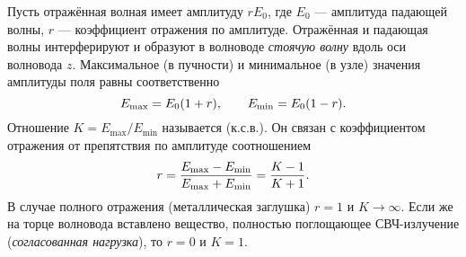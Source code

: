 Пусть отражённая волная имеет амплитуду $r E_0$, где $E_0$ --- амплитуда
падающей волны, $r$ --- коэффициент отражения по амплитуде.
Отражённая и падающая волны интерферируют и образуют в волноводе 
\emph{стоячую волну} вдоль оси волновода $z$.
Максимальное (в пучности) и минимальное (в узле) значения амплитуды поля равны
соответственно 
\begin{equation*} \eqmark{2.0.5} 
E_{\text{max}}=E_0(1+r),
\qquad E_{\text{min}}=E_0(1-r). 
\end{equation*} 
Отношение
$K=E_{\text{max}}/E_{\text{min}}$ называется  (к.с.в.). Он связан с коэффициентом отражения от препятствия по амплитуде
соотношением
\begin{equation} \eqmark{2.0.6}
r=\dfrac{E_{\text{max}}-E_{\text{min}}}{E_{\text{max}}+E_{\text{min}}}=\dfrac{K-1}{K+1}. 
\end{equation}
В случае полного отражения (металлическая заглушка) $r=1$ и $K\to \infty$.
Если же на торце волновода вставлено вещество, полностью поглощающее СВЧ-­излучение
(\emph{согласованная нагрузка}),  то $r=0$ и $K=1$.

%
%
%


